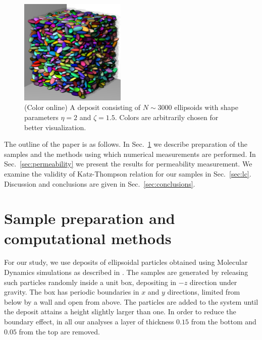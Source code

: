 \documentclass[aps,twocolumn,superscriptaddress,showpacs,showkeys]{revtex4-1}
\begin{document}
\begin{figure}
\begin{center}
\includegraphics*[width=0.45\textwidth,angle=0]{fig1}
\caption{\protect
            (Color online)
            A deposit consisting of $N\sim 3000 $ ellipsoids 
            with shape parameters $\eta=2$ and $\zeta=1.5$.
            Colors are arbitrarily chosen for better visualization.}
\label{fig:deposit}
\end{center}
\end{figure}
 
The outline of the paper is as follows. 
In Sec.~\ref{sec:simulations} we describe preparation of the samples 
and the methods using which numerical measurements are performed.
In Sec.~\ref{sec:permeability} we present the results for permeability measurement. 
We examine the validity of Katz-Thompson relation for our samples in Sec.~\ref{sec:lc}.  
Discussion and conclusions are given in Sec.~\ref{sec:conclusions}.


\section{Sample preparation and computational methods}
\label{sec:simulations}
For our study, we use deposits of ellipsoidal particles obtained using
Molecular Dynamics simulations as described in \cite{ref:reza-pedro2011}.  The
samples are generated by releasing such particles randomly inside a unit box,
depositing in $-z$ direction under gravity. The box has periodic boundaries in
$x$ and $y$ directions, limited from below by a wall and open from above. The
particles are added to the system until the deposit attains a height slightly
larger than one.  In order to reduce the boundary effect, in all our analyses
a layer of thickness $0.15$ from the bottom and $0.05$ from the top are
removed.
\end{document}
